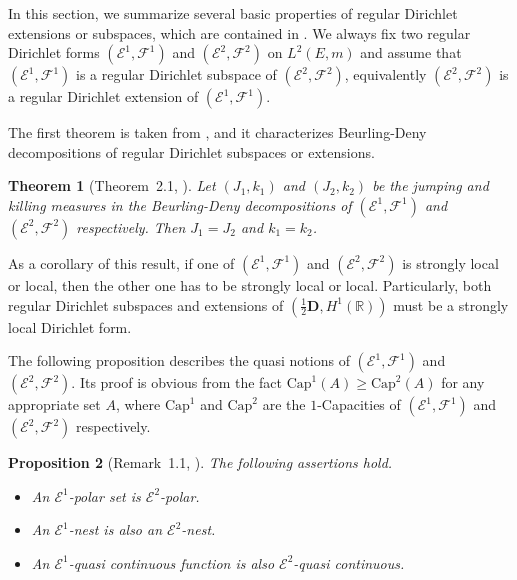 \documentclass[a4paper]{amsart}
\newtheorem{theorem}{Theorem}[section]
\newtheorem{proposition}[theorem]{Proposition}
\theoremstyle{definition}
\theoremstyle{remark}
\numberwithin{equation}{section}
\begin{document}
In this section, we summarize several basic properties of regular Dirichlet extensions or subspaces, which are contained in \cite{LS16, LS16-2, LUY15, LY15, LY15-3, LY15-2}. We always fix two regular Dirichlet forms $({{\mathcal{E}}}^1,{{\mathcal{F}}}^1)$ and $({{\mathcal{E}}}^2,{{\mathcal{F}}}^2)$ on $L^2(E,m)$ and assume that $({{\mathcal{E}}}^1,{{\mathcal{F}}}^1)$ is a regular Dirichlet subspace of $({{\mathcal{E}}}^2,{{\mathcal{F}}}^2)$, equivalently $({{\mathcal{E}}}^2,{{\mathcal{F}}}^2)$ is a regular Dirichlet extension of $({{\mathcal{E}}}^1,{{\mathcal{F}}}^1)$.

The first theorem is taken from \cite{LY15}, and it characterizes Beurling-Deny decompositions of regular Dirichlet subspaces or extensions.

\begin{theorem}[Theorem~2.1, \cite{LY15}]\label{THM21}
 Let $(J_1, k_1)$ and $(J_2,k_2)$ be the jumping and killing measures in the Beurling-Deny decompositions of $({{\mathcal{E}}}^1,{{\mathcal{F}}}^1)$ and $({{\mathcal{E}}}^2,{{\mathcal{F}}}^2)$ respectively. Then $J_1=J_2$ and $k_1=k_2$.
\end{theorem}

 As a corollary of this result, if one of $({{\mathcal{E}}}^1,{{\mathcal{F}}}^1)$ and $({{\mathcal{E}}}^2, {{\mathcal{F}}}^2)$ is strongly local or local, then the other one has to be strongly local or local. Particularly, both regular Dirichlet subspaces and extensions of $(\frac{1}{2}\mathbf{D}, H^1(\mathbb{R}))$ must be a strongly local Dirichlet form.

The following proposition describes the quasi notions of $({{\mathcal{E}}}^1,{{\mathcal{F}}}^1)$ and $({{\mathcal{E}}}^2,{{\mathcal{F}}}^2)$. Its proof is obvious from the fact $\text{Cap}^1(A)\geq \text{Cap}^2(A)$ for any appropriate set $A$, where $\text{Cap}^1$ and $\text{Cap}^2$ are the $1$-Capacities of $({{\mathcal{E}}}^1,{{\mathcal{F}}}^1)$ and $({{\mathcal{E}}}^2,{{\mathcal{F}}}^2)$ respectively.

\begin{proposition}[Remark~1.1, \cite{LY15}]\label{PRO22}
The following assertions hold.
\begin{itemize}
\item[(1)] An ${{\mathcal{E}}}^1$-polar set is ${{\mathcal{E}}}^2$-polar.
\item[(2)] An ${{\mathcal{E}}}^1$-nest is also an ${{\mathcal{E}}}^2$-nest.
\item[(3)] An ${{\mathcal{E}}}^1$-quasi continuous function is also ${{\mathcal{E}}}^2$-quasi continuous.
\end{itemize}
\end{proposition}
\end{document}
